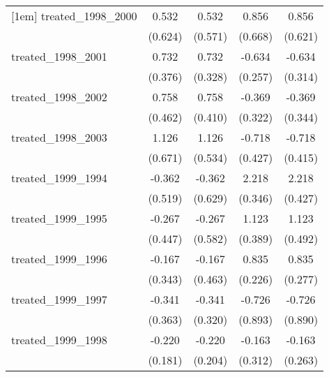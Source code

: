 {\begin{tabular}{l*{4}{c}}
[1em]
treated\_1998\_2000&       0.532         &       0.532         &       0.856         &       0.856         \\
            &     (0.624)         &     (0.571)         &     (0.668)         &     (0.621)         \\
[1em]
treated\_1998\_2001&       0.732         &       0.732\sym{*}  &      -0.634\sym{*}  &      -0.634\sym{*}  \\
            &     (0.376)         &     (0.328)         &     (0.257)         &     (0.314)         \\
[1em]
treated\_1998\_2002&       0.758         &       0.758         &      -0.369         &      -0.369         \\
            &     (0.462)         &     (0.410)         &     (0.322)         &     (0.344)         \\
[1em]
treated\_1998\_2003&       1.126         &       1.126\sym{*}  &      -0.718         &      -0.718         \\
            &     (0.671)         &     (0.534)         &     (0.427)         &     (0.415)         \\
[1em]
treated\_1999\_1994&      -0.362         &      -0.362         &       2.218\sym{***}&       2.218\sym{***}\\
            &     (0.519)         &     (0.629)         &     (0.346)         &     (0.427)         \\
[1em]
treated\_1999\_1995&      -0.267         &      -0.267         &       1.123\sym{**} &       1.123\sym{*}  \\
            &     (0.447)         &     (0.582)         &     (0.389)         &     (0.492)         \\
[1em]
treated\_1999\_1996&      -0.167         &      -0.167         &       0.835\sym{***}&       0.835\sym{**} \\
            &     (0.343)         &     (0.463)         &     (0.226)         &     (0.277)         \\
[1em]
treated\_1999\_1997&      -0.341         &      -0.341         &      -0.726         &      -0.726         \\
            &     (0.363)         &     (0.320)         &     (0.893)         &     (0.890)         \\
[1em]
treated\_1999\_1998&      -0.220         &      -0.220         &      -0.163         &      -0.163         \\
            &     (0.181)         &     (0.204)         &     (0.312)         &     (0.263)         \\

\end{tabular}}
